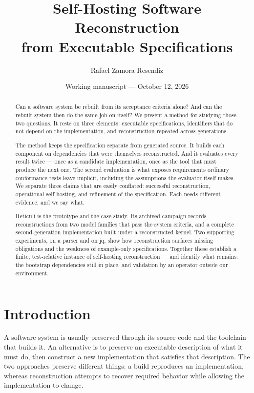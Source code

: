 \documentclass[10pt,twocolumn,letterpaper]{article}
\title{Self-Hosting Software Reconstruction\\from Executable Specifications}
\author{Rafael Zamora-Resendiz}
\date{Working manuscript --- October 12, 2026}
\begin{document}
\maketitle
\begin{abstract}
Can a software system be rebuilt from its acceptance criteria alone? And can the rebuilt system then do the same job on itself? We present a method for studying those two questions. It rests on three elements: executable specifications, identifiers that do not depend on the implementation, and reconstruction repeated across generations.

The method keeps the specification separate from generated source. It builds each component on dependencies that were themselves reconstructed. And it evaluates every result twice --- once as a candidate implementation, once as the tool that must produce the next one. The second evaluation is what exposes requirements ordinary conformance tests leave implicit, including the assumptions the evaluator itself makes. We separate three claims that are easily conflated: successful reconstruction, operational self-hosting, and refinement of the specification. Each needs different evidence, and we say what.

Reticuli is the prototype and the case study. Its archived campaign records reconstructions from two model families that pass the system criteria, and a complete second-generation implementation built under a reconstructed kernel. Two supporting experiments, on a parser and on jq, show how reconstruction surfaces missing obligations and the weakness of example-only specifications. Together these establish a finite, test-relative instance of self-hosting reconstruction --- and identify what remains: the bootstrap dependencies still in place, and validation by an operator outside our environment.
\end{abstract}

\section{Introduction}
A software system is usually preserved through its source code and the toolchain that builds it. An alternative is to preserve an executable description of what it must do, then construct a new implementation that satisfies that description. The two approaches preserve different things: a build reproduces an implementation, whereas reconstruction attempts to recover required behavior while allowing the implementation to change.
\end{document}
